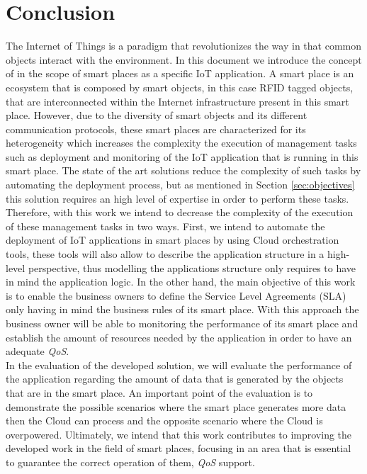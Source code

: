 \section{Conclusion}
\label{sec:conclusion}
The Internet of Things is a paradigm that revolutionizes the way in that common objects
interact with the environment. In this document we introduce the concept of in the scope of smart
places as a specific IoT application. A smart place is an ecosystem that is composed by smart objects,
in this case RFID tagged objects, that are interconnected within the Internet infrastructure present
in this smart place. However, due to the diversity of smart objects and its different communication
protocols, these smart places are characterized for its heterogeneity which increases the
complexity the execution of management tasks such as deployment and monitoring of the
IoT application that is running in this smart place. The state of the art solutions
reduce the complexity of such tasks by automating the deployment process, but as mentioned
in Section \ref{sec:objectives} this solution requires an high level of expertise in
order to perform these tasks.\\

Therefore, with this work we intend to decrease the complexity of the execution of these
management tasks in two ways. First, we intend to automate the deployment of IoT applications
in smart places by using Cloud orchestration tools, these tools will also allow to describe
the application structure in a high-level perspective, thus modelling the applications
structure only requires to have in mind the application logic. In the other hand, the main
objective of this work is to enable the business owners to define the Service Level Agreements (SLA)
only having in mind the business rules of its smart place. With this approach the business owner will
be able to monitoring the performance of its smart place and establish the amount of resources
needed by the application in order to
have an adequate \textit{QoS}.\\

In the evaluation of the developed solution, we will evaluate the performance of the application
regarding the amount of data that is generated by the objects that are in the smart place.
An important point of the evaluation is to demonstrate the possible scenarios where the smart
place generates more data then the Cloud can process and the opposite scenario where the Cloud is
overpowered. Ultimately, we intend that this work contributes to improving the developed work in
the field of smart places, focusing in an area that is essential to guarantee the correct
operation of them, \textit{QoS} support.
